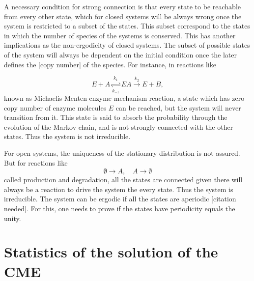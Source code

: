 \documentclass[conference]{IEEEtran}
\begin{document}
A necessary condition for strong connection is that every state to be reachable from every other state, which for closed systems will be always wrong once the system is restricted to a subset of the states. This subset correspond to the states in which the number of species of the systems is conserved. This has another implications as the non-ergodicity of closed systems. The subset of possible states of the system will always be dependent on the initial condition once the later defines the [copy number] of the species. For instance, in reactions like

\begin{equation}
E + A \underset{k_{-1}}{\stackrel{k_1}{\rightleftharpoons}} EA \overset{k_2}{\rightarrow} E + B,
\end{equation}
%
known as Michaelis-Menten enzyme mechanism reaction, a state which has zero copy number of enzyme molecules $E$ can be reached, but the system will never transition from it. This state is said to absorb the probability through the evolution of the Markov chain, and is not strongly connected with the other states. Thus the system is not irreducible.

For open systems, the uniqueness of the stationary distribution is not assured. But for reactions like
%
\begin{equation}
\emptyset \rightarrow A, \quad A \rightarrow \emptyset
\end{equation}
%
called production and degradation, all the states are connected given there will always be a reaction to drive the system the every state. Thus the system is irreducible. The system can be ergodic if all the states are aperiodic [citation needed]. For this, one needs to prove if the states have periodicity equals the unity.
%

\section{Statistics of the solution of the CME}
\end{document}
